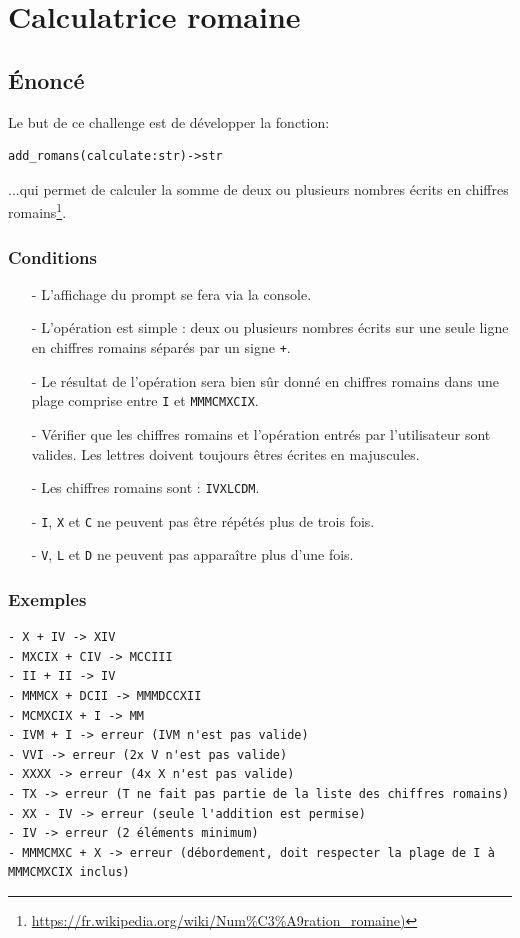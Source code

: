 \chapter{Calculatrice romaine}
\vspace{2cm}
\section{Énoncé}
Le but de ce challenge est de développer la fonction:
\begin{verbatim}
add_romans(calculate:str)->str
\end{verbatim}
...qui permet de calculer la somme de deux ou plusieurs nombres écrits en chiffres romains\footnote{\url{https://fr.wikipedia.org/wiki/Num\%C3\%A9ration_romaine)}}.

\subsection*{Conditions}
\begin{itemize}
	\item[-] L'affichage du prompt se fera via la console.
	\item[-] L'opération est simple : deux ou plusieurs nombres écrits sur une seule ligne en chiffres romains séparés par un signe \texttt{+}.
	\item[-] Le résultat de l'opération sera bien sûr donné en chiffres romains dans une plage comprise entre \texttt{I} et \texttt{MMMCMXCIX}.
	\item[-] Vérifier que les chiffres romains et l'opération entrés par l'utilisateur sont valides. Les lettres doivent toujours êtres écrites en majuscules.
	\item[-] Les chiffres romains sont : \texttt{IVXLCDM}.
	\item[-] \texttt{I}, \texttt{X} et \texttt{C} ne peuvent pas être répétés plus de trois fois.
	\item[-] \texttt{V}, \texttt{L} et \texttt{D} ne peuvent pas apparaître plus d'une fois.
\end{itemize}
\medskip

\subsection*{Exemples}
\begin{verbatim}
- X + IV -> XIV
- MXCIX + CIV -> MCCIII
- II + II -> IV
- MMMCX + DCII -> MMMDCCXII
- MCMXCIX + I -> MM
- IVM + I -> erreur (IVM n'est pas valide)
- VVI -> erreur (2x V n'est pas valide)
- XXXX -> erreur (4x X n'est pas valide)
- TX -> erreur (T ne fait pas partie de la liste des chiffres romains)
- XX - IV -> erreur (seule l'addition est permise)
- IV -> erreur (2 éléments minimum) 
- MMMCMXC + X -> erreur (débordement, doit respecter la plage de I à 
MMMCMXCIX inclus)
\end{verbatim}
\medskip

